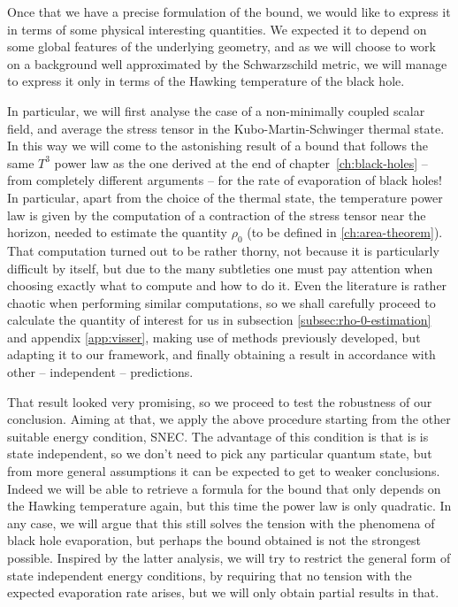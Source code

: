 Once that we have a precise formulation of the bound, we would like to express it in terms of some physical interesting quantities. We expected it to depend on some global features of the underlying geometry, and as we will choose to work on a background well approximated by the Schwarzschild metric, we will manage to express it only in terms of the Hawking temperature of the black hole.  

In particular, we will first analyse the case of a non-minimally coupled scalar field, and average the stress tensor in the Kubo-Martin-Schwinger thermal state. In this way we will come to the astonishing result of a bound that follows the same \(T^3\) power law as the one derived at the end of chapter~\ref{ch:black-holes} -- from completely different arguments -- for the rate of evaporation of black holes!
In particular, apart from the choice of the thermal state, the temperature power law is given by the computation of a contraction of the stress tensor near the horizon, needed to estimate the quantity \(\rho_0\) (to be defined in \ref{ch:area-theorem}). That computation turned out to be rather thorny, not because it is particularly difficult by itself, but due to the many subtleties one must pay attention when choosing exactly what to compute and how to do it. Even the literature is rather chaotic when performing similar computations, so we shall carefully proceed to calculate the quantity of interest for us in subsection \ref{subsec:rho-0-estimation} and appendix \ref{app:visser}, making use of methods previously developed, but adapting it to our framework, and finally obtaining a result in accordance with other -- independent -- predictions. 

That result looked very promising, so we proceed to test the robustness of our conclusion. Aiming at that, we apply the above procedure starting from the other suitable energy condition, SNEC. The advantage of this condition is that is is state independent, so we don't need to pick any particular quantum state, but from more general assumptions it can be expected to get to weaker conclusions. Indeed we will be able to retrieve a formula for the bound that only depends on the Hawking temperature again, but this time the power law is only quadratic.
In any case, we will argue that this still solves the tension with the phenomena of black hole evaporation, but perhaps the bound obtained is not the strongest possible.
Inspired by the latter analysis, we will try to restrict the general form of state independent energy conditions, by requiring that no tension with the expected evaporation rate arises, but we will only obtain partial results in that.

